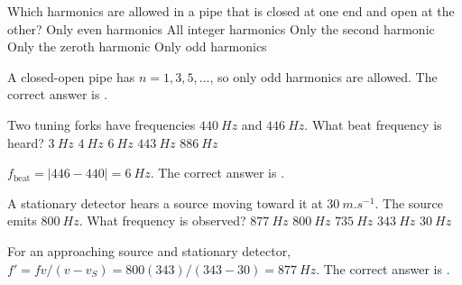 \documentclass[full,print,11pt,a4paper]{physicsquiz}
\begin{document}
\begin{quizbank}
  \begin{quizquestion}[
    id=ow-pipe-025,
    topic=sound-pipes,
    difficulty=foundation,
    marks=1,
    correct=E,
    tags={closed-pipe,odd-harmonics},
    outcome={Recall allowed harmonics in a closed-open pipe}
  ]
    Which harmonics are allowed in a pipe that is closed at one end and open at
    the other?
    \choices
      {Only even harmonics}
      {All integer harmonics}
      {Only the second harmonic}
      {Only the zeroth harmonic}
      {Only odd harmonics}
  \end{quizquestion}
  \begin{quizsolution}
    A closed-open pipe has \(n=1,3,5,\ldots\), so only odd harmonics are allowed.
    The correct answer is \quizcorrectletter.
  \end{quizsolution}

  \begin{quizquestion}[
    id=ow-beats-026,
    topic=beats,
    difficulty=applied,
    marks=1,
    correct=C,
    tags={beats},
    outcome={Compute beat frequency}
  ]
    Two tuning forks have frequencies \(\SI{440}{Hz}\) and \(\SI{446}{Hz}\). What
    beat frequency is heard?
    \choices
      {\(\SI{3}{Hz}\)}
      {\(\SI{4}{Hz}\)}
      {\(\SI{6}{Hz}\)}
      {\(\SI{443}{Hz}\)}
      {\(\SI{886}{Hz}\)}
  \end{quizquestion}
  \begin{quizsolution}
    \(f_{\text{beat}}=|446-440|=\SI{6}{Hz}\). The correct answer is
    \quizcorrectletter.
  \end{quizsolution}

  \begin{quizquestion}[
    id=ow-doppler-027,
    topic=doppler-effect,
    difficulty=applied,
    marks=1,
    correct=A,
    tags={doppler,moving-source},
    outcome={Compute observed frequency for an approaching source}
  ]
    A stationary detector hears a source moving toward it at
    \(\SI{30}{m.s^{-1}}\). The source emits \(\SI{800}{Hz}\). What frequency is
    observed?
    \choices
      {\(\SI{877}{Hz}\)}
      {\(\SI{800}{Hz}\)}
      {\(\SI{735}{Hz}\)}
      {\(\SI{343}{Hz}\)}
      {\(\SI{30}{Hz}\)}
  \end{quizquestion}
  \begin{quizsolution}
    For an approaching source and stationary detector,
    \(f'=f v/(v-v_S)=800(343)/(343-30)=\SI{877}{Hz}\). The correct answer is
    \quizcorrectletter.
  \end{quizsolution}


\end{quizbank}
\end{document}
